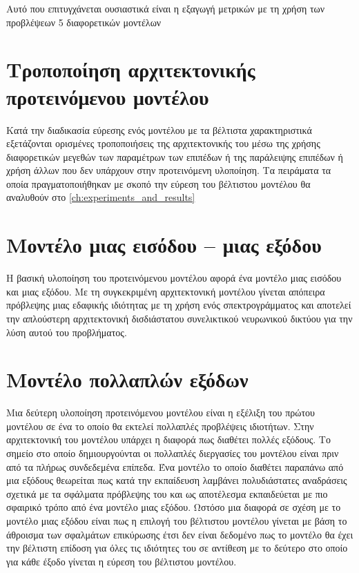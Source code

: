Αυτό που επιτυγχάνεται ουσιαστικά είναι η εξαγωγή μετρικών με τη χρήση των προβλέψεων 5 διαφορετικών μοντέλων

\section{Τροποποίηση αρχιτεκτονικής προτεινόμενου μοντέλου}
Κατά την διαδικασία εύρεσης ενός μοντέλου με τα βέλτιστα χαρακτηριστικά εξετάζονται ορισμένες τροποποιήσεις της αρχιτεκτονικής του μέσω της χρήσης διαφορετικών μεγεθών των παραμέτρων των επιπέδων ή της παράλειψης επιπέδων ή χρήση άλλων που δεν υπάρχουν στην προτεινόμενη υλοποίηση. Τα πειράματα τα οποία πραγματοποιήθηκαν με σκοπό την εύρεση του βέλτιστου μοντέλου θα αναλυθούν στο \ref{ch:experiments_and_results}

\section{Μοντέλο μιας εισόδου -- μιας εξόδου}
Η βασική υλοποίηση του προτεινόμενου μοντέλου αφορά ένα μοντέλο μιας εισόδου και μιας εξόδου. Με τη συγκεκριμένη αρχιτεκτονική μοντέλου γίνεται απόπειρα πρόβλεψης μιας εδαφικής ιδιότητας με τη χρήση ενός σπεκτρογράμματος και αποτελεί την απλούστερη αρχιτεκτονική δισδιάστατου συνελικτικού νευρωνικού δικτύου για την λύση αυτού του προβλήματος.

\section{Μοντέλο πολλαπλών εξόδων}
Μια δεύτερη υλοποίηση προτεινόμενου μοντέλου είναι η εξέλιξη του πρώτου μοντέλου σε ένα το οποίο θα εκτελεί πολλαπλές προβλέψεις ιδιοτήτων. Στην αρχιτεκτονική του μοντέλου υπάρχει η διαφορά πως διαθέτει πολλές εξόδους. Το σημείο στο οποίο δημιουργούνται οι πολλαπλές διεργασίες του μοντέλου είναι πριν από τα πλήρως συνδεδεμένα επίπεδα. Ένα μοντέλο το οποίο διαθέτει παραπάνω από μια εξόδους θεωρείται πως κατά την εκπαίδευση λαμβάνει πολυδιάστατες αναδράσεις σχετικά με τα σφάλματα πρόβλεψης του και ως αποτέλεσμα εκπαιδεύεται με πιο σφαιρικό τρόπο από ένα μοντέλο μιας εξόδου. Ωστόσο μια διαφορά σε σχέση με το μοντέλο μιας εξόδου είναι πως η επιλογή του βέλτιστου μοντέλου γίνεται με βάση το άθροισμα των σφαλμάτων επικύρωσης έτσι δεν είναι δεδομένο πως το μοντέλο θα έχει την βέλτιστη επίδοση για όλες τις ιδιότητες του σε αντίθεση με το δεύτερο στο οποίο για κάθε έξοδο γίνεται η εύρεση του βέλτιστου μοντέλου.

